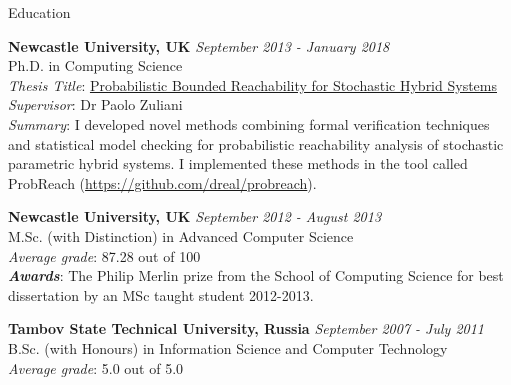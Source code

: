 \documentclass{resume} %
\begin{document}

\begin{rSection}{Education}


{\bf Newcastle University, UK} \hfill {\em September 2013 - January 2018} \\ 
Ph.D. in Computing Science  \\
{\em Thesis Title}: \href{http://hdl.handle.net/10443/4046}{Probabilistic Bounded Reachability for Stochastic Hybrid Systems} \\ 
{\em Supervisor}: Dr Paolo Zuliani \\
{\em Summary}: I developed novel methods combining formal verification techniques
and statistical model checking for probabilistic reachability analysis
of stochastic parametric hybrid systems. 
I implemented these methods in the tool 
called ProbReach (\url{https://github.com/dreal/probreach}).

\smallskip 

{\bf Newcastle University, UK} \hfill {\em September 2012 - August 2013} \\ 
M.Sc. (with Distinction) in Advanced Computer Science \\
{\em Average grade}: 87.28 out of 100 \\
{\bf {\em Awards}}: The Philip Merlin prize from the School of Computing Science 
for best dissertation by an MSc taught student 2012-2013.
\smallskip 

{\bf Tambov State Technical University, Russia} \hfill {\em September 2007 - July 2011} \\ 
B.Sc. (with Honours) in Information Science and Computer Technology \\
{\em Average grade}: 5.0 out of 5.0
\smallskip 

\end{rSection}





\end{document}
